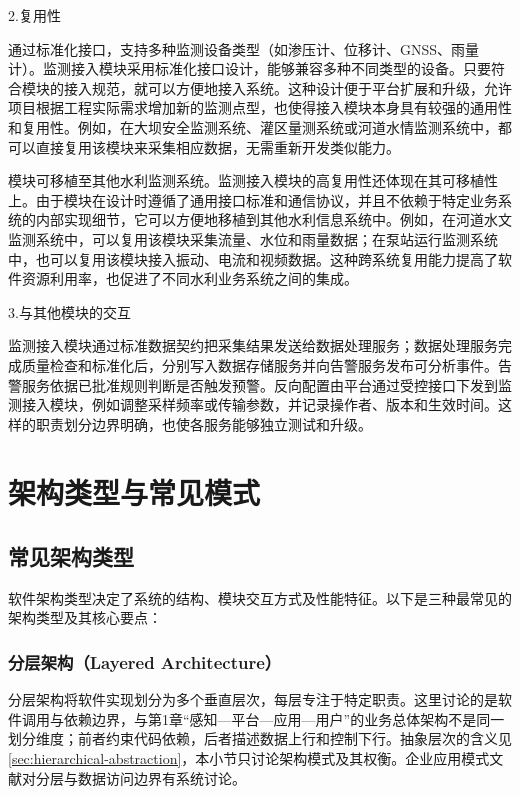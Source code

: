 2.复用性

通过标准化接口，支持多种监测设备类型（如渗压计、位移计、GNSS、雨量计）。监测接入模块采用标准化接口设计，能够兼容多种不同类型的设备。只要符合模块的接入规范，就可以方便地接入系统。这种设计便于平台扩展和升级，允许项目根据工程实际需求增加新的监测点型，也使得接入模块本身具有较强的通用性和复用性。例如，在大坝安全监测系统、灌区量测系统或河道水情监测系统中，都可以直接复用该模块来采集相应数据，无需重新开发类似能力。

模块可移植至其他水利监测系统。监测接入模块的高复用性还体现在其可移植性上。由于模块在设计时遵循了通用接口标准和通信协议，并且不依赖于特定业务系统的内部实现细节，它可以方便地移植到其他水利信息系统中。例如，在河道水文监测系统中，可以复用该模块采集流量、水位和雨量数据；在泵站运行监测系统中，也可以复用该模块接入振动、电流和视频数据。这种跨系统复用能力提高了软件资源利用率，也促进了不同水利业务系统之间的集成。

3.与其他模块的交互

监测接入模块通过标准数据契约把采集结果发送给数据处理服务；数据处理服务完成质量检查和标准化后，分别写入数据存储服务并向告警服务发布可分析事件。告警服务依据已批准规则判断是否触发预警。反向配置由平台通过受控接口下发到监测接入模块，例如调整采样频率或传输参数，并记录操作者、版本和生效时间。这样的职责划分边界明确，也使各服务能够独立测试和升级。

\section{架构类型与常见模式}

\subsection{常见架构类型}

软件架构类型决定了系统的结构、模块交互方式及性能特征。以下是三种最常见的架构类型及其核心要点：

\subsubsection{分层架构（Layered Architecture）}\label{sec:software-layered-architecture}
分层架构将软件实现划分为多个垂直层次，每层专注于特定职责。这里讨论的是软件调用与依赖边界，与第1章“感知—平台—应用—用户”的业务总体架构不是同一划分维度；前者约束代码依赖，后者描述数据上行和控制下行。抽象层次的含义见\ref{sec:hierarchical-abstraction}，本小节只讨论架构模式及其权衡。企业应用模式文献对分层与数据访问边界有系统讨论\cite{fowler2002}。

